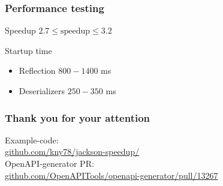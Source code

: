 \documentclass{beamer}
\begin{document}
    \begin{frame}
        \frametitle{Performance testing}

        \begin{block}{Speedup}
            $2.7 \le \textrm{speedup} \le 3.2$
        \end{block}
        \begin{block}{Startup time}

            \begin{itemize}
                \item Reflection $800 - 1400$ ms
                \item Deserializers $250 - 350$ ms
            \end{itemize}
        \end{block}

    \end{frame}


    \begin{frame}
        \frametitle{Thank you for your attention}
        Example-code:\\
        \href{https://github.com/kny78/jackson-speedup/}{github.com/kny78/jackson-speedup/}\\[1,0cm]
        OpenAPI-generator PR: \\
        \href{https://github.com/OpenAPITools/openapi-generator/pull/13267}{github.com/OpenAPITools/openapi-generator/pull/13267}\\
    \end{frame}
\end{document}
